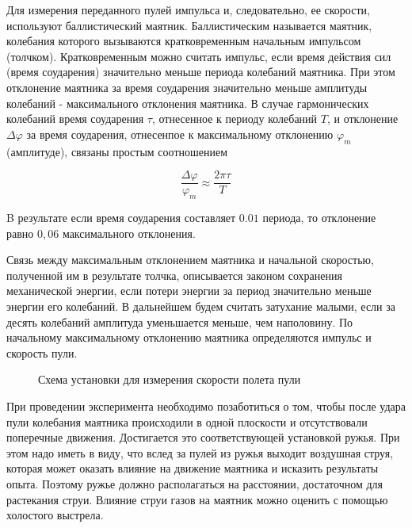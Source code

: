 \documentclass[14pt]{article}
\begin{document}
Для измерения переданного пулей импульса и, следовательно, ее скорости, используют баллистический маятник. Баллистическим называется маятник, колебания которого вызываются кратковременным начальным импульсом (толчком). Кратковременным можно считать импульс, если время действия сил (время соударения) значительно меньше периода колебаний маятника. При этом отклонение маятника за время соударения значительно меньше амплитуды колебаний - максимального отклонения маятника. В случае гармонических колебаний время соударения $\tau$, отнесенное к периоду колебаний $T$, и отклонение $\Delta\varphi$ за время соударения, отнесенпое к максимальному отклонению $\varphi_m$(амплитуде), связаны простым соотношением

$$
	\frac{\Delta\varphi}{\varphi_m} \approx \frac{2\pi\tau}{T}
$$

B результате если время соударения составляет $0.01$ периода, то отклонение равно $0,06$ максимального отклонения. 

Связь между максимальным отклонением маятника и начальной скоростью, полученной им в результате толчка, описывается законом сохранения механической энергии, если потери энергии за период значительно меньше энергии его колебаний. В дальнейшем будем считать затухание малыми, если за десять колебаний амплитуда уменьшается меньше, чем наполовину. По начальному максимальному отклонению маятника определяются импульс и скорость пули.

\begin{figure}[h!]
	\caption{Схема установки для измерения скорости полета пули}
\end{figure} 

При проведении эксперимента необходимо позаботиться о том, чтобы после удара пули колебания маятника происходили в одной плоскости и отсутствовали поперечные движения. Достигается это соответствующей установкой ружья. При этом надо иметь в виду, что вслед за пулей из ружья выходит воздушная струя, которая может оказать влияние на движение маятника и исказить результаты опыта. Поэтому ружье должно располагаться на расстоянии, достаточном для растекания струи. Влияние струи газов на маятник можно оценить с помощью холостого выстрела.
\end{document}
